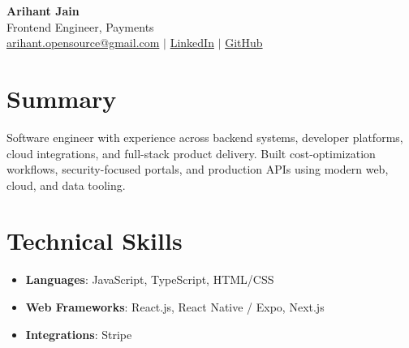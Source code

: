 \documentclass[11pt,a4paper]{article}
\begin{document}
\begin{center}
{\LARGE \textbf{Arihant Jain}}
\\ Frontend Engineer, Payments
\\ \href{mailto:arihant.opensource@gmail.com}{arihant.opensource@gmail.com} $\mid$ \href{https://linkedin.com/in/arihantjain1208}{LinkedIn} $\mid$ \href{https://github.com/Arihant1208}{GitHub}
\end{center}

\section{Summary}
Software engineer with experience across backend systems, developer platforms, cloud integrations, and full-stack product delivery. Built cost-optimization workflows, security-focused portals, and production APIs using modern web, cloud, and data tooling.

\section{Technical Skills}
\begin{itemize}
  \item \textbf{Languages}: JavaScript, TypeScript, HTML/CSS
  \item \textbf{Web Frameworks}: React.js, React Native / Expo, Next.js
  \item \textbf{Integrations}: Stripe
\end{itemize}
\end{document}
